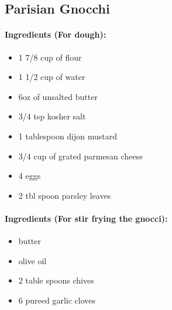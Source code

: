 \documentclass{article}
\begin{document}
\subsection{Parisian Gnocchi} 

\paragraph{Ingredients (For dough):}
\begin{itemize}
    \item 1 7/8 cup of flour
    \item 1 1/2 cup of water
    \item 6oz of unsalted butter
    \item 3/4 tsp kosher salt
    \item 1 tablespoon dijon mustard
    \item 3/4 cup of grated parmesan cheese
    \item 4 eggs
    \item 2 tbl spoon parsley leaves
\end{itemize}  

\paragraph{Ingredients (For stir frying the gnocci):}
\begin{itemize}
    \item butter
    \item olive oil
    \item 2 table spoons chives
    \item 6 pureed garlic cloves
\end{itemize}  
\end{document}
